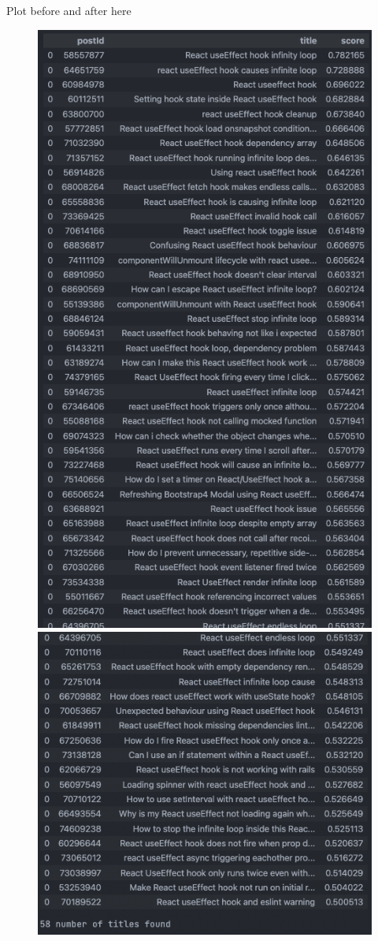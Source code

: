 Plot before and after here
\begin{figure}[H]
  \noindent \includegraphics[scale=0.45]{assets/spacy-query-1-results.png}
  \noindent \includegraphics[scale=0.45]{assets/spacy-query-1-results-1.png}

\end{figure}
